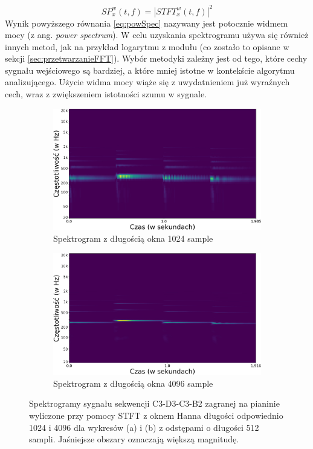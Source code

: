 \documentclass[12pt,a4paper,twoside]{mwart}
\begin{document}
\begin{equation} \label{eq:powSpec}
  SP_x^w(t,f) = |STFT_x^w(t,f)|^2
\end{equation} 
Wynik powyższego równania \ref{eq:powSpec} nazywany jest potocznie widmem mocy (z ang. \textit{power spectrum}). W celu uzyskania spektrogramu używa się również innych metod, jak na przykład logarytmu z modułu (co zostało to opisane w sekcji \ref{sec:przetwarzanieFFT}). Wybór metodyki zależny jest od tego, które cechy sygnału wejściowego są bardziej, a które mniej istotne w kontekście algorytmu analizującego. Użycie widma mocy wiąże się z uwydatnieniem już wyraźnych cech, wraz z zwiększeniem istotności szumu w sygnale.

\begin{figure}[t]
  \begin{subfigure}{.49\textwidth}
    \centering
    \includegraphics[width=1.\linewidth]{images/Spectrogram/spectrogram_1024_cropped.jpg}
    \caption{Spektrogram z długością okna 1024 sample}
  \end{subfigure}
  \begin{subfigure}{.5\textwidth}
    \centering
    \includegraphics[width=1.\linewidth]{images/Spectrogram/spectrogram_4096_cropped.jpg}
    \caption{Spektrogram z długością okna 4096 sample}
  \end{subfigure}
  \caption{Spektrogramy sygnału sekwencji C3-D3-C3-B2 zagranej na pianinie wyliczone przy pomocy STFT z oknem Hanna długości odpowiednio 1024 i 4096 dla wykresów (a) i (b) z odstępami o długości 512 sampli. Jaśniejsze obszary oznaczają większą magnitudę.}
  \label{fig:windowSize}
\end{figure}
\end{document}
